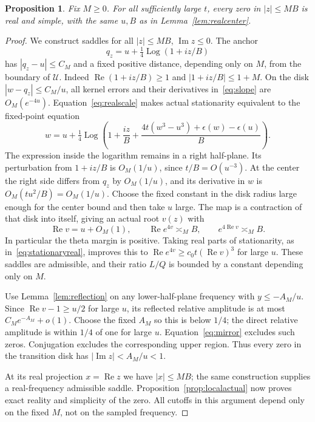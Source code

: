 \documentclass[11pt]{article}
\newtheorem{proposition}[theorem]{Proposition}
\theoremstyle{remark}\newtheorem{remark}[theorem]{Remark}
\DeclareMathOperator{\Rea}{Re}\DeclareMathOperator{\Ima}{Im}
\DeclareMathOperator{\Log}{Log}
\begin{document}
\begin{proposition}\label{prop:transition}
Fix $M\geq0$. For all sufficiently large $t$, every zero in
$|z|\leq MB$ is real and simple, with the same $u,B$ as in
Lemma~\ref{lem:realcenter}.
\end{proposition}
\begin{proof}
We construct saddles for all $|z|\leq MB$, $\Ima z\leq0$.
The anchor
\[
 q_z=u+\tfrac14\Log(1+iz/B)
\]
has $|q_z-u|\leq C_M$ and a fixed positive distance, depending
only on $M$, from the boundary of $\mathcal U$. Indeed
$\Rea(1+iz/B)\geq1$ and $|1+iz/B|\leq1+M$.
On the disk $|w-q_z|\leq C_M/u$, all kernel errors and their
derivatives in~\eqref{eq:slope} are $O_M(e^{-4u})$.
Equation~\eqref{eq:realscale} makes actual stationarity
equivalent to the fixed-point equation
\begin{equation}\label{eq:transitionfixed}
 w=u+\tfrac14\Log\left(1+\frac{iz}{B}
       +\frac{4t(w^3-u^3)+\epsilon(w)-\epsilon(u)}B\right).
\end{equation}
The expression inside the logarithm remains in a right
half-plane. Its perturbation from $1+iz/B$ is $O_M(1/u)$,
since $t/B=O(u^{-3})$. At the center the right side differs
from $q_z$ by $O_M(1/u)$, and its derivative in $w$ is
$O_M(tu^2/B)=O_M(1/u)$.
Choose the fixed constant in the disk radius large enough
for the center bound and then take $u$ large. The map is a
contraction of that disk into itself, giving an actual root
$v(z)$ with
\[
 \Rea v=u+O_M(1),\qquad
 \Rea e^{4v}\asymp_M B,\qquad
 e^{4\Rea v}\asymp_M B.
\]
In particular the theta margin is positive. Taking real parts
of stationarity, as in~\eqref{eq:stationaryreal}, improves
this to $\Rea e^{4v}\geq c_0t(\Rea v)^3$ for large $u$.
These saddles are admissible, and their ratio $L/Q$ is bounded
by a constant depending only on $M$.

Use Lemma~\ref{lem:reflection} on any lower-half-plane
frequency with $y\leq-A_M/u$. Since
$\Rea v-1\geq u/2$ for large $u$, its reflected relative
amplitude is at most $C_Me^{-A_M}+o(1)$.
Choose the fixed $A_M$ so this is below $1/4$; the direct
relative amplitude is within $1/4$ of one for large $u$.
Equation~\eqref{eq:mirror} excludes such zeros.
Conjugation excludes the corresponding upper region.
Thus every zero in the transition disk has
$|\Ima z|<A_M/u<1$.

At its real projection $x=\Rea z$ we have $|x|\leq MB$;
the same construction supplies a real-frequency admissible
saddle. Proposition~\ref{prop:localactual} now proves exact
reality and simplicity of the zero.
All cutoffs in this argument depend only on the fixed $M$,
not on the sampled frequency.
\end{proof}
\end{document}
